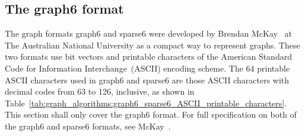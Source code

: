 
\subsection{The graph6 format}

The graph formats graph6 and sparse6 were developed by Brendan
McKay~\cite{McKay2010} at The Australian National University as a
compact way to represent graphs. These two formats use bit vectors and
printable characters of the American Standard Code for Information
Interchange~(ASCII) encoding scheme. The 64 printable ASCII characters
used in graph6 and sparse6 are those ASCII characters with decimal
codes from 63 to 126, inclusive, as shown in
Table~\ref{tab:graph_algorithms:graph6_sparse6_ASCII_printable_characters}.
This section shall only cover the graph6 format. For full
specification on both of the graph6 and sparse6 formats, see
McKay~\cite{McKay2010}.

